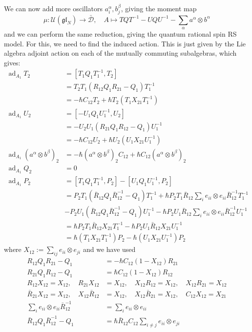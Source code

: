 \documentclass[11pt]{report}
\theoremstyle{definition}
\theoremstyle{remark}
\theoremstyle{remark}
\begin{document}
We can now add more oscillators $a_i^\alpha,b_j^\beta$, giving the moment map
\begin{equation*}
\mu: \mathcal{U}(\mathfrak{gl}_N) \to \bar{\mathcal{D}}, \quad A \mapsto TQT^{-1} - UQU^{-1} - \sum_\alpha a^\alpha \otimes b^\alpha
\end{equation*}
and we can perform the same reduction, giving the quantum rational spin RS model. For this, we need to find the induced action. This is just given by the Lie algebra adjoint action on each of the mutually commuting subalgebras, which gives:
\begin{align*}
\operatorname{ad}_{A_1} T_2
&= [T_1 Q_1 T_1^{-1},T_2] \\
&= T_2 T_1 (R_{12} Q_1 R_{21}-Q_1) T_1^{-1} \\
&= -\hbar C_{12} T_2 + \hbar T_2 (T_1 X_{21} T_1^{-1}) \\
\operatorname{ad}_{A_1} U_2
&= [-U_1 Q_1 U_1^{-1},U_2] \\
&= -U_2 U_1 (R_{21} Q_1 R_{12}-Q_1) U_1^{-1} \\
&= -\hbar C_{12} U_2 + \hbar U_2 (U_1 X_{21} U_1^{-1}) \\
\operatorname{ad}_{A_1} (a^\alpha \otimes b^\beta)_2 &= -\hbar (a^\alpha \otimes b^\beta)_2 C_{12} + \hbar C_{12} (a^\alpha \otimes b^\beta)_2 \\
\operatorname{ad}_{A_1} Q_2 &= 0 \\
\operatorname{ad}_{A_1} P_2 &= [T_1 Q_1 T_1^{-1},P_2] - [U_1 Q_1 U_1^{-1},P_2] \\
&= P_2 T_1 (\bar R_{12} Q_1 \bar R_{12}^{-1}-Q_1) T_1^{-1}
+ \hbar P_2 T_1 \bar R_{12} \sum_i e_{ii} \otimes e_{ii} \bar R_{12}^{-1} T_1^{-1} \\
&- P_2 U_1 (\bar R_{12} Q_1 \bar R_{12}^{-1}-Q_1) U_1^{-1}
- \hbar P_2 U_1 \bar R_{12} \sum_i e_{ii} \otimes e_{ii} \bar R_{12}^{-1} U_1^{-1} \\
&= \hbar P_2 T_1 \bar R_{12} X_{21} T_1^{-1} - \hbar P_2 U_1 \bar R_{12} X_{21} U_1^{-1} \\
&= \hbar (T_1 X_{21} T_1^{-1}) P_2 - \hbar (U_1 X_{21} U_1^{-1}) P_2
\end{align*}
where $X_{12} := \sum_{ij} e_{ii} \otimes e_{ji}$ and we have used
\begin{align*}
R_{12} Q_1 R_{21}-Q_1 &= -\hbar C_{12} (1-X_{12}) R_{21} \\
R_{21} Q_1 R_{12}-Q_1 &= \hbar C_{12} (1-X_{12}) R_{12} \\
R_{12} X_{12} = X_{12}, \quad R_{21} X_{12} &= X_{12}, \quad X_{12} R_{12} = X_{12}, \quad X_{12} R_{21} = X_{12} \\
\bar R_{21} X_{12} = X_{12}, \quad X_{12} \bar R_{12} &= X_{12}, \quad X_{12} \bar R_{21} = X_{12}, \quad C_{12} X_{12} = X_{21} \\
\sum_i e_{ii} \otimes e_{ii} \bar R_{12}^{-1} &= \sum_i e_{ii} \otimes e_{ii} \\
\bar R_{12} Q_1 \bar R_{12}^{-1} - Q_1 &= \hbar \bar R_{12} C_{12} \sum_{i \neq j} e_{ii} \otimes e_{ji}
\end{align*}
\end{document}
